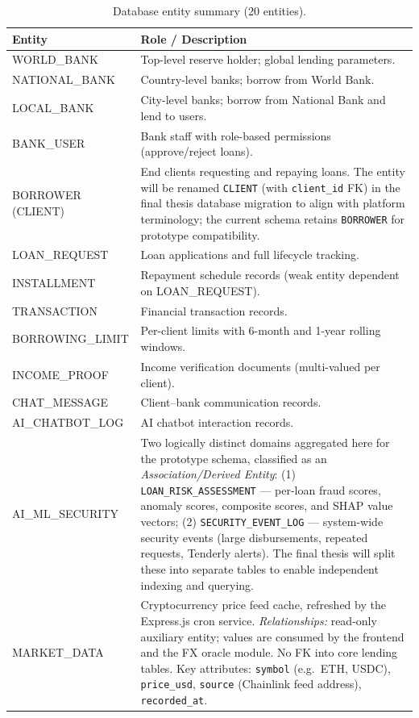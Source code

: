 \documentclass[12pt,a4paper]{report}
\begin{document}
\begin{table}[H]
\centering
\caption{Database entity summary (20 entities).}
\label{tab:db-entities}
\begin{tabular}{p{4cm}p{9.5cm}}
\hline
\textbf{Entity} & \textbf{Role / Description} \\
\hline
WORLD\_BANK & Top-level reserve holder; global lending parameters. \\
NATIONAL\_BANK & Country-level banks; borrow from World Bank. \\
LOCAL\_BANK & City-level banks; borrow from National Bank and lend to users. \\
BANK\_USER & Bank staff with role-based permissions (approve/reject loans). \\
BORROWER (CLIENT) & End clients requesting and repaying loans. The entity will be renamed \texttt{CLIENT} (with \texttt{client\_id} FK) in the final thesis database migration to align with platform terminology; the current schema retains \texttt{BORROWER} for prototype compatibility. \\
LOAN\_REQUEST & Loan applications and full lifecycle tracking. \\
INSTALLMENT & Repayment schedule records (weak entity dependent on LOAN\_REQUEST). \\
TRANSACTION & Financial transaction records. \\
BORROWING\_LIMIT & Per-client limits with 6-month and 1-year rolling windows. \\
INCOME\_PROOF & Income verification documents (multi-valued per client). \\
CHAT\_MESSAGE & Client--bank communication records. \\
AI\_CHATBOT\_LOG & AI chatbot interaction records. \\
AI\_ML\_SECURITY & Two logically distinct domains aggregated here for the prototype schema, classified as an \textit{Association/Derived Entity}: (1) \texttt{LOAN\_RISK\_ASSESSMENT} --- per-loan fraud scores, anomaly scores, composite scores, and SHAP value vectors; (2) \texttt{SECURITY\_EVENT\_LOG} --- system-wide security events (large disbursements, repeated requests, Tenderly alerts). The final thesis will split these into separate tables to enable independent indexing and querying. \\
MARKET\_DATA & Cryptocurrency price feed cache, refreshed by the Express.js cron service. \textit{Relationships:} read-only auxiliary entity; values are consumed by the frontend and the FX oracle module. No FK into core lending tables. Key attributes: \texttt{symbol} (e.g.\ ETH, USDC), \texttt{price\_usd}, \texttt{source} (Chainlink feed address), \texttt{recorded\_at}. \\

\end{tabular}
\end{table}
\end{document}
